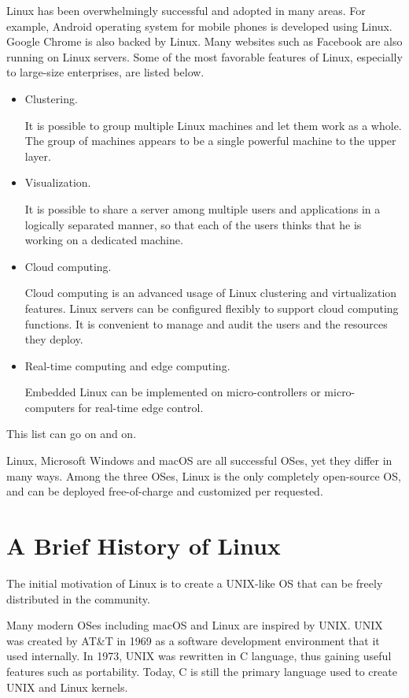Linux has been overwhelmingly successful and adopted in many areas. For example, Android operating system for mobile phones is developed using Linux. Google Chrome is also backed by Linux. Many websites such as Facebook are also running on Linux servers. Some of the most favorable features of Linux, especially to large-size enterprises, are listed below.
\begin{itemize}
  \item Clustering. 
  
  It is possible to group multiple Linux machines and let them work as a whole. The group of machines appears to be a single powerful machine to the upper layer.
  
  \item Visualization. 
  
  It is possible to share a server among multiple users and applications in a logically separated manner, so that each of the users thinks that he is working on a dedicated machine.
  
  \item Cloud computing. 
  
  Cloud computing is an advanced usage of Linux clustering and virtualization features. Linux servers can be configured flexibly to support cloud computing functions. It is convenient to manage and audit the users and the resources they deploy. 
  
  \item Real-time computing and edge computing. 
  
  Embedded Linux can be implemented on micro-controllers or micro-computers for real-time edge control.
\end{itemize}
This list can go on and on.

Linux, Microsoft Windows and macOS are all successful OSes, yet they differ in many ways. Among the three OSes, Linux is the only completely open-source OS, and can be deployed free-of-charge and customized per requested.

\section{A Brief History of Linux}

The initial motivation of Linux is to create a UNIX-like OS that can be freely distributed in the community.

Many modern OSes including macOS and Linux are inspired by UNIX. UNIX was created by AT\&T in 1969 as a software development environment that it used internally. In 1973, UNIX was rewritten in C language, thus gaining useful features such as portability. Today, C is still the primary language used to create UNIX and Linux kernels.

